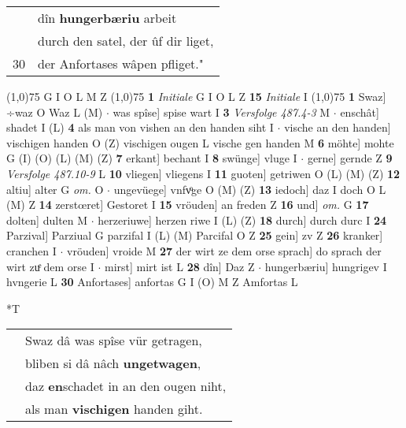 \documentclass[8pt,a4paper,notitlepage]{article}
\begin{document}
\begin{table}[ht]
\begin{minipage}[t]{0.5\linewidth}
\begin{tabular}{rl}
 & dîn \textbf{hungerbæriu} arbeit\\ 
 & durch den satel, der ûf dir liget,\\ 
30 & der Anfortases wâpen pfliget."\\ 
\end{tabular}
\scriptsize
\line(1,0){75} \newline
G I O L M Z \newline
\line(1,0){75} \newline
\textbf{1} \textit{Initiale} G I O L Z  \textbf{15} \textit{Initiale} I  \newline
\line(1,0){75} \newline
\textbf{1} Swaz] ÷waz O Waz L (M)  $\cdot$ was spîse] spise wart I \textbf{3} \textit{Versfolge 487.4-3} M   $\cdot$ enschât] shadet I (L) \textbf{4} als man von vishen an den handen siht I  $\cdot$ vische an den handen] vischigen handen O (Z) vischigen ougen L vische gen handen M \textbf{6} möhte] mohte G (I) (O) (L) (M) (Z) \textbf{7} erkant] bechant I \textbf{8} swünge] vluge I  $\cdot$ gerne] gernde Z \textbf{9} \textit{Versfolge 487.10-9} L  \textbf{10} vliegen] vliegens I \textbf{11} guoten] getriwen O (L) (M) (Z) \textbf{12} altiu] alter G \textit{om.} O  $\cdot$ ungevüege] vnfvͦge O (M) (Z) \textbf{13} iedoch] daz I doch O L (M) Z \textbf{14} zerstœret] Gestoret I \textbf{15} vröuden] an freden Z \textbf{16} und] \textit{om.} G \textbf{17} dolten] dulten M  $\cdot$ herzeriuwe] herzen riwe I (L) (Z) \textbf{18} durch] durch durc I \textbf{24} Parzival] Parziual G parzifal I (L) (M) Parcifal O Z \textbf{25} gein] zv Z \textbf{26} kranker] cranchen I  $\cdot$ vröuden] vroide M \textbf{27} der wirt ze dem orse sprach] do sprach der wirt zuͤ dem orse I  $\cdot$ mirst] mirt ist L \textbf{28} dîn] Daz Z  $\cdot$ hungerbæriu] hungrigev I hvngerie L \textbf{30} Anfortases] anfortas G I (O) M Z Amfortas L \newline
\end{minipage}
\hspace{0.5cm}
\begin{minipage}[t]{0.5\linewidth}
\small
\begin{center}*T
\end{center}
\begin{tabular}{rl}
 & Swaz dâ was spîse vür getragen,\\ 
 & bliben si dâ nâch \textbf{ungetwagen},\\ 
 & daz \textbf{en}schadet in an den ougen niht,\\ 
 & als man \textbf{vischigen} handen giht.\\ 

\end{tabular}
\end{minipage}
\end{table}
\end{document}
